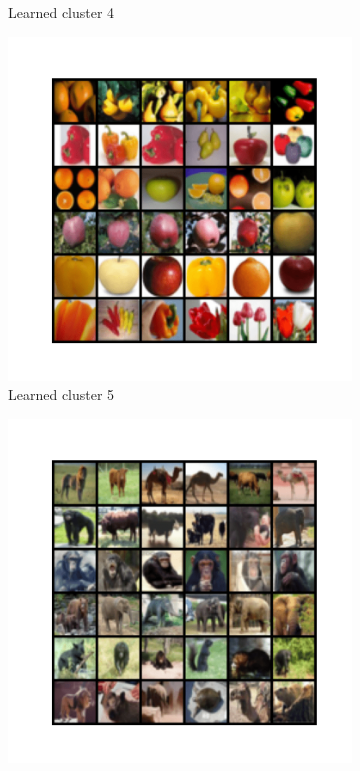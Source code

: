 \documentclass[10pt,twocolumn,letterpaper]{article}
\begin{document}
\begin{figure}
\begin{subfigure}{0.32\textwidth}
       \caption{Learned cluster 4}
     \end{subfigure}
     \hfill
     \begin{subfigure}{0.32\textwidth}
       \includegraphics[width=\linewidth,trim={1cm 2cm 1cm 2cm},clip]{figures/experiments/cifar100_cluster/nearest_class4.png}
       \caption{Learned cluster 5}
     \end{subfigure}
     \hfill
     \begin{subfigure}{0.32\textwidth}
       \includegraphics[width=\linewidth,trim={1cm 2cm 1cm 2cm},clip]{figures/experiments/cifar100_cluster/nearest_class5.png}

\end{subfigure}
\end{figure}
\end{document}

